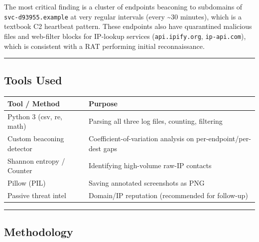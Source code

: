 \documentclass[
]{article}
\begin{document}
The most critical finding is a cluster of endpoints beaconing to
subdomains of \texttt{svc-d93955.example} at very regular intervals
(every \textasciitilde30 minutes), which is a textbook C2 heartbeat
pattern. These endpoints also have quarantined malicious files and
web-filter blocks for IP-lookup services (\texttt{api.ipify.org},
\texttt{ip-api.com}), which is consistent with a RAT performing initial
reconnaissance.

\begin{center}\rule{0.5\linewidth}{0.5pt}\end{center}

\subsection{Tools Used}\label{tools-used}

\begin{longtable}[]{@{}
  >{\raggedright\arraybackslash}p{}
  >{\raggedright\arraybackslash}p{}@{}}
\toprule\noalign{}
\begin{minipage}[b]{\linewidth}\raggedright
Tool / Method
\end{minipage} & \begin{minipage}[b]{\linewidth}\raggedright
Purpose
\end{minipage} \\
\midrule\noalign{}
\endhead
\bottomrule\noalign{}
\endlastfoot
Python 3 (csv, re, math) & Parsing all three log files, counting,
filtering \\
Custom beaconing detector & Coefficient-of-variation analysis on
per-endpoint/per-dest gaps \\
Shannon entropy / Counter & Identifying high-volume raw-IP contacts \\
Pillow (PIL) & Saving annotated screenshots as PNG \\
Passive threat intel & Domain/IP reputation (recommended for
follow-up) \\
\end{longtable}

\begin{center}\rule{0.5\linewidth}{0.5pt}\end{center}

\subsection{Methodology}\label{methodology}
\end{document}
